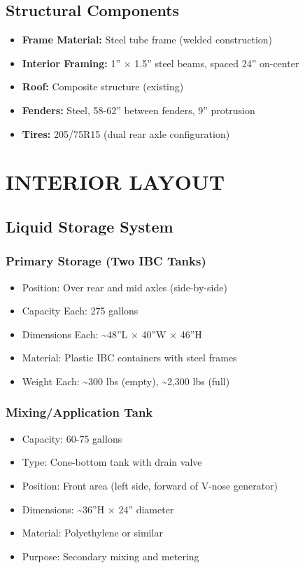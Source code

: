 \documentclass[11pt,letter]{article}
\begin{document}
\subsection{Structural Components}
\begin{itemize}
  \item \textbf{Frame Material:} Steel tube frame (welded construction)
  \item \textbf{Interior Framing:} 1'' × 1.5'' steel beams, spaced 24'' on-center
  \item \textbf{Roof:} Composite structure (existing)
  \item \textbf{Fenders:} Steel, 58-62'' between fenders, 9'' protrusion
  \item \textbf{Tires:} 205/75R15 (dual rear axle configuration)
\end{itemize}

\section{INTERIOR LAYOUT}

\subsection{Liquid Storage System}

\subsubsection{Primary Storage (Two IBC Tanks)}
\begin{itemize}
  \item Position: Over rear and mid axles (side-by-side)
  \item Capacity Each: 275 gallons
  \item Dimensions Each: \textasciitilde{}48''L × 40''W × 46''H
  \item Material: Plastic IBC containers with steel frames
  \item Weight Each: \textasciitilde{}300 lbs (empty), \textasciitilde{}2,300 lbs (full)
\end{itemize}

\subsubsection{Mixing/Application Tank}
\begin{itemize}
  \item Capacity: 60-75 gallons
  \item Type: Cone-bottom tank with drain valve
  \item Position: Front area (left side, forward of V-nose generator)
  \item Dimensions: \textasciitilde{}36''H × 24'' diameter
  \item Material: Polyethylene or similar
  \item Purpose: Secondary mixing and metering
\end{itemize}
\end{document}
